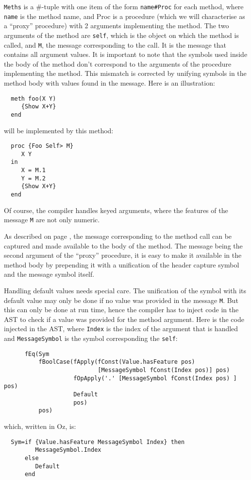 \documentclass[a4paper]{memoir}
\begin{document}
\lstinline!Meths! is a \#-tuple with one item of the form \lstinline!name#Proc! for each
method, where \lstinline!name! is the method name, and Proc is a procedure
(which we will characterise as a ``proxy'' procedure) with
2 arguments implementing the method. The two arguments of the method are
\lstinline!self!,
which is the object on which the method is called, and \lstinline!M!, the message
corresponding to the call. It is the message that contains all argument values.
It is important to note that the symbols used inside the body of the method
don't correspond to the arguments of the procedure implementing the method.
This mismatch is corrected by unifying symbols in the method body with values
found in the message. Here is an illustration:
\begin{lstlisting}
  meth foo(X Y)
     {Show X+Y}
  end 
\end{lstlisting}
will be implemented by this method:
\begin{lstlisting}
  proc {Foo Self> M}
     X Y
  in
     X = M.1
     Y = M.2
     {Show X+Y}
  end  
\end{lstlisting}
Of course, the compiler handles keyed arguments, where the features of the
message \lstinline!M! are not only numeric.

As described on page \pageref{compilerinput:classes:headcapture}, the message
corresponding to the method call can be captured and made available to the body of the
method. The message being the second argument of the ``proxy'' procedure, it is
easy to make it available in the method body by prepending it with a unification
of the header capture symbol and the message symbol itself.

Handling default values needs special care. The unification of the symbol with its default value may only be done
if no value was provided in the message \lstinline!M!. But this can only be done at run time, hence the compiler
has to inject code in the AST to check if a value was provided for the method argument.
Here is the code injected in the AST, where \lstinline!Index! is the index of the argument that is handled and 
\lstinline!MessageSymbol! is the symbol corresponding the \lstinline!self!:
\begin{lstlisting}
      fEq(Sym 
          fBoolCase(fApply(fConst(Value.hasFeature pos) 
                           [MessageSymbol fConst(Index pos)] pos)
                    fOpApply('.' [MessageSymbol fConst(Index pos) ] pos)
                    Default 
                    pos) 
          pos)
\end{lstlisting}
which, written in Oz, is:
\begin{lstlisting}
  Sym=if {Value.hasFeature MessageSymbol Index} then 
         MessageSymbol.Index 
      else
         Default
      end
\end{lstlisting}
\end{document}
